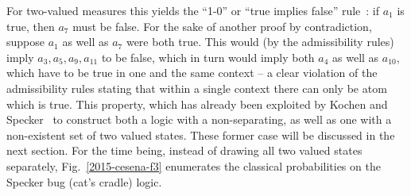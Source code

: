 \documentclass[%
  twocolumn,
 showpacs,
 showkeys,
 preprintnumbers,
 amsmath,amssymb,
 aps,
  pra,
  longbibliography,
 floatfix,
 ]{revtex4-1}
\begin{document}
For two-valued measures this yields the ``1-0'' or ``true implies false'' rule~\cite{svozil-2006-omni}:
if $a_1$ is true, then $a_7$ must be false.
For the sake of another proof by contradiction,
suppose $a_1$ as well as $a_7$ were both true.
This would (by the admissibility rules) imply $a_3, a_5, a_9, a_{11}$ to be false, which in turn would imply both $a_4$ as well as $a_{10}$,
which have to be true  in one and the  same context -- a clear violation of the admissibility rules stating
that within a single context there can only be atom which is true.
This property,
which has already been exploited by Kochen and Specker~\cite[$\Gamma_1$]{kochen1}
to construct both a logic with a non-separating,
as well as one with a non-existent set of two valued states. These former case will be discussed in the next section.
For the time being, instead of drawing all two valued states separately,
Fig.~\ref{2015-cesena-f3}  enumerates
the classical probabilities on the Specker bug (cat's cradle) logic.
\end{document}
